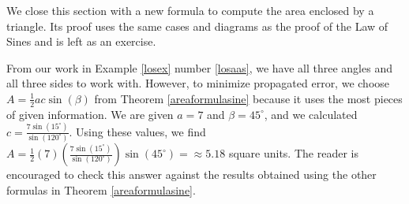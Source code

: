 \medskip 

We close this section with a new formula to compute the area enclosed by a triangle.  Its proof uses the same cases and diagrams as the proof of the Law of Sines and is left as an exercise.

\smallskip


\medskip

{ From our work in  Example \ref{losex} number \ref{losaas}, we have all three angles and all three sides to work with.  However, to minimize propagated error, we choose $A = \frac{1}{2} ac \sin(\beta)$ from Theorem \ref{areaformulasine} because it uses the most pieces of given information.  We are given  $a = 7$ and $\beta = 45^{\circ}$, and we calculated $c = \frac{7\sin\left(15^{\circ}\right)}{\sin\left(120^{\circ}\right)}$.   Using these values, we find $A =  \frac{1}{2}(7)\left(\frac{7\sin\left(15^{\circ}\right)}{\sin\left(120^{\circ}\right)} \right) \sin\left(45^{\circ}\right) =  \approx 5.18$ square units. The reader is encouraged to check this answer against the results obtained using the other formulas in Theorem \ref{areaformulasine}.}


